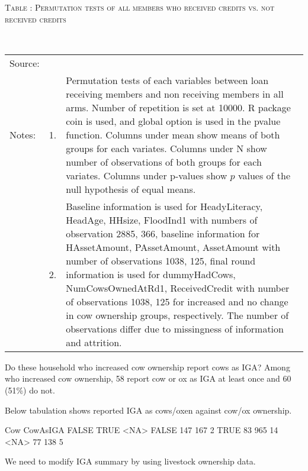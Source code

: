 \hspace{-1cm}\begin{minipage}[t]{14cm}
\hfil\textsc{\normalsize Table \thetable: Permutation tests of all members who received credits vs. not received credits\label{tab permutation cow 4}}\\
\setlength{\tabcolsep}{1pt}
\setlength{\baselineskip}{8pt}
\renewcommand{\arraystretch}{.55}
\hfil{}\\
\renewcommand{\arraystretch}{.8}
\setlength{\tabcolsep}{1pt}
\begin{tabular}{>{\hfill\scriptsize}p{1cm}<{}>{\hfill\scriptsize}p{.25cm}<{}>{\scriptsize}p{12cm}<{\hfill}}
Source:& \multicolumn{2}{l}{\scriptsize Estimated with GUK administrative and survey data.}\\
Notes: & 1. & Permutation tests of each variables between loan receiving members and non receiving members in all arms. Number of repetition is set at 10000. \textsf{R} package \textsf{coin} is used, and \textsf{global} option is used in the \textsf{pvalue} function. Columns under \textsf{mean} show means of both groups for each variates. Columns under \textsf{N} show number of observations of both groups for each variates. Columns under \textsf{p-values} show $p$ values of the null hypothesis of equal means. \\
& 2. & Baseline information is used for \textsf{HeadyLiteracy, HeadAge, HHsize, FloodInd1} with numbers of observation 2885, 366, baseline information for \textsf{HAssetAmount, PAssetAmount, AssetAmount} with number of observations 1038, 125, final round information is used for \textsf{dummyHadCows, NumCowsOwnedAtRd1, ReceivedCredit} with number of observations 1038, 125 for increased and no change in cow ownership groups, respectively. The number of observations differ due to missingness of information and attrition.
\end{tabular}
\end{minipage}


Do these household who increased cow ownership report cows as IGA? Among who increased cow ownership, 58 report cow or ox as IGA at least once and 60 (51\%) do not. \gobblepars

Below tabulation shows reported IGA as cows/oxen against cow/ox ownership.
\begin{Schunk}
\begin{Soutput}
        Cow
CowAsIGA FALSE TRUE <NA>
   FALSE   147  167    2
   TRUE     83  965   14
   <NA>     77  138    5
\end{Soutput}
\end{Schunk}
We need to modify IGA summary by using livestock ownership data.



